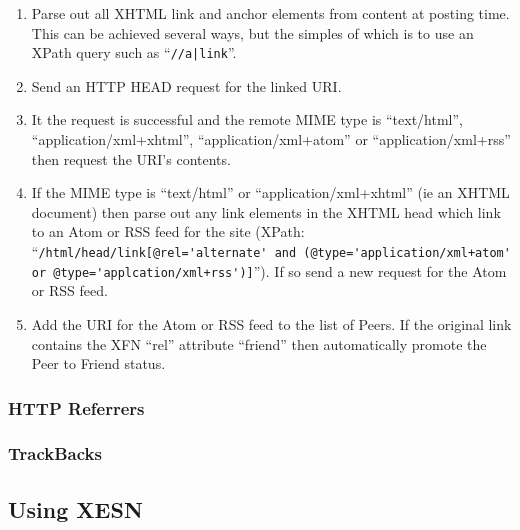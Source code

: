 \documentclass[titlepage,english,a4paper,twoside,dvips]{article}
\begin{document}
\begin{enumerate}

\item Parse out all XHTML link and anchor elements from content at posting time.  This can be achieved several ways, but the simples of which is to use an XPath query such as ``\verb+//a|link+''.

\item Send an HTTP HEAD request for the linked URI.

\item It the request is successful and the remote MIME type is ``text/html'', ``application/xml+xhtml'', ``application/xml+atom'' or ``application/xml+rss'' then request the URI's contents.

\item If the MIME type is ``text/html'' or ``application/xml+xhtml'' (ie an XHTML document) then parse out any link elements in the XHTML head which link to an Atom or RSS feed for the site (XPath: ``\verb|/html/head/link[@rel='alternate' and (@type='application/xml+atom' or @type='applcation/xml+rss')]|'').  If so send a new request for the Atom or RSS feed.

\item Add the URI for the Atom or RSS feed to the list of Peers.  If the original link contains the XFN ``rel'' attribute ``friend'' then automatically promote the Peer to Friend status.

\end{enumerate}


\subsubsection{HTTP Referrers}

\subsubsection{TrackBacks}

\subsection{Using XESN}
\end{document}
